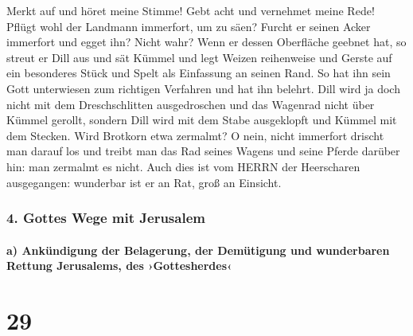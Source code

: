 Merkt auf und höret meine Stimme! Gebt acht und vernehmet
meine Rede! Pflügt wohl der Landmann immerfort, um zu
säen? Furcht er seinen Acker immerfort und egget ihn?
Nicht wahr? Wenn er dessen Oberfläche geebnet hat, so
streut er Dill aus und sät Kümmel und legt Weizen reihenweise und Gerste
auf ein besonderes Stück und Spelt als Einfassung an seinen Rand.
So hat ihn sein Gott unterwiesen zum richtigen Verfahren
und hat ihn belehrt. Dill wird ja doch nicht mit dem
Dreschschlitten ausgedroschen und das Wagenrad nicht über Kümmel
gerollt, sondern Dill wird mit dem Stabe ausgeklopft und Kümmel mit dem
Stecken. Wird Brotkorn etwa zermalmt? O nein, nicht
immerfort drischt man darauf los und treibt man das Rad seines Wagens
und seine Pferde darüber hin: man zermalmt es nicht. Auch
dies ist vom HERRN der Heerscharen ausgegangen: wunderbar ist er an Rat,
groß an Einsicht.

\hypertarget{gottes-wege-mit-jerusalem}{%
\subsubsection{4. Gottes Wege mit
Jerusalem}\label{gottes-wege-mit-jerusalem}}

\hypertarget{a-ankuxfcndigung-der-belagerung-der-demuxfctigung-und-wunderbaren-rettung-jerusalems-des-gottesherdes}{%
\paragraph{a) Ankündigung der Belagerung, der Demütigung und wunderbaren
Rettung Jerusalems, des
›Gottesherdes‹}\label{a-ankuxfcndigung-der-belagerung-der-demuxfctigung-und-wunderbaren-rettung-jerusalems-des-gottesherdes}}

\hypertarget{section-28}{%
\section{29}\label{section-28}}

